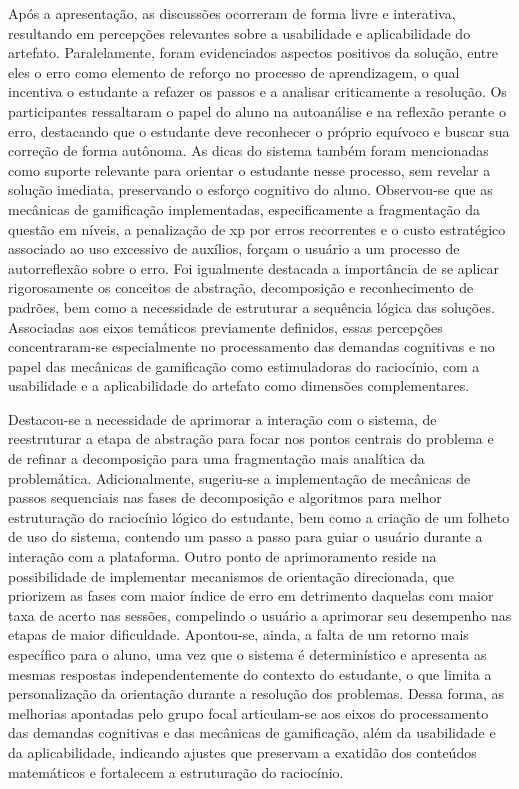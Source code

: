 Após a apresentação, as discussões ocorreram de forma livre e interativa, resultando em percepções relevantes sobre a usabilidade e aplicabilidade do artefato. Paralelamente, foram evidenciados aspectos positivos da solução, entre eles o erro como elemento de reforço no processo de aprendizagem, o qual incentiva o estudante a refazer os passos e a analisar criticamente a resolução. Os participantes ressaltaram o papel do aluno na autoanálise e na reflexão perante o erro, destacando que o estudante deve reconhecer o próprio equívoco e buscar sua correção de forma autônoma. As dicas do sistema também foram mencionadas como suporte relevante para orientar o estudante nesse processo, sem revelar a solução imediata, preservando o esforço cognitivo do aluno. Observou-se que as mecânicas de gamificação implementadas, especificamente a fragmentação da questão em níveis, a penalização de \gls{xp} por erros recorrentes e o custo estratégico associado ao uso excessivo de auxílios, forçam o usuário a um processo de autorreflexão sobre o erro. Foi igualmente destacada a importância de se aplicar rigorosamente os conceitos de abstração, decomposição e reconhecimento de padrões, bem como a necessidade de estruturar a sequência lógica das soluções. Associadas aos eixos temáticos previamente definidos, essas percepções concentraram-se especialmente no processamento das demandas cognitivas e no papel das mecânicas de gamificação como estimuladoras do raciocínio, com a usabilidade e a aplicabilidade do artefato como dimensões complementares.

Destacou-se a necessidade de aprimorar a interação com o sistema, de reestruturar a etapa de abstração para focar nos pontos centrais do problema e de refinar a decomposição para uma fragmentação mais analítica da problemática. Adicionalmente, sugeriu-se a implementação de mecânicas de passos sequenciais nas fases de decomposição e algoritmos para melhor estruturação do raciocínio lógico do estudante, bem como a criação de um folheto de uso do sistema, contendo um passo a passo para guiar o usuário durante a interação com a plataforma. Outro ponto de aprimoramento reside na possibilidade de implementar mecanismos de orientação direcionada, que priorizem as fases com maior índice de erro em detrimento daquelas com maior taxa de acerto nas sessões, compelindo o usuário a aprimorar seu desempenho nas etapas de maior dificuldade. Apontou-se, ainda, a falta de um retorno mais específico para o aluno, uma vez que o sistema é determinístico e apresenta as mesmas respostas independentemente do contexto do estudante, o que limita a personalização da orientação durante a resolução dos problemas. Dessa forma, as melhorias apontadas pelo grupo focal articulam-se aos eixos do processamento das demandas cognitivas e das mecânicas de gamificação, além da usabilidade e da aplicabilidade, indicando ajustes que preservam a exatidão dos conteúdos matemáticos e fortalecem a estruturação do raciocínio.

